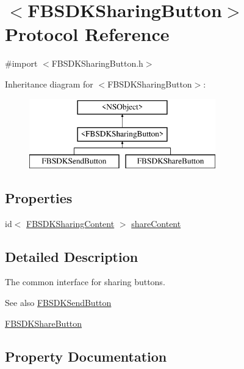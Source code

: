 \hypertarget{protocol_f_b_s_d_k_sharing_button-p}{}\section{$<$F\+B\+S\+D\+K\+Sharing\+Button$>$ Protocol Reference}
\label{protocol_f_b_s_d_k_sharing_button-p}


{\ttfamily \#import $<$F\+B\+S\+D\+K\+Sharing\+Button.\+h$>$}

Inheritance diagram for $<$F\+B\+S\+D\+K\+Sharing\+Button$>$\+:\begin{figure}[H]
\begin{center}
\leavevmode
\includegraphics[height=3.000000cm]{protocol_f_b_s_d_k_sharing_button-p}
\end{center}
\end{figure}
\subsection*{Properties}
\begin{DoxyCompactItemize}
\item 
id$<$ \hyperlink{protocol_f_b_s_d_k_sharing_content-p}{F\+B\+S\+D\+K\+Sharing\+Content} $>$ \hyperlink{protocol_f_b_s_d_k_sharing_button-p_a065e0c554fc3c324e3c065ed46c1c6cb}{share\+Content}
\end{DoxyCompactItemize}


\subsection{Detailed Description}
The common interface for sharing buttons. \begin{DoxySeeAlso}{See also}
\hyperlink{interface_f_b_s_d_k_send_button}{F\+B\+S\+D\+K\+Send\+Button} 

\hyperlink{interface_f_b_s_d_k_share_button}{F\+B\+S\+D\+K\+Share\+Button} 
\end{DoxySeeAlso}


\subsection{Property Documentation}
\hypertarget{protocol_f_b_s_d_k_sharing_button-p_a065e0c554fc3c324e3c065ed46c1c6cb}{}

